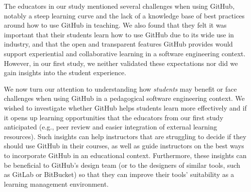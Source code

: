 The educators in our study mentioned several challenges when using GitHub, notably a steep learning curve and the lack of a knowledge base of best practices around how to use GitHub in teaching. We also found that they felt it was important that their students learn how to use GitHub due to its wide use in industry, and that the open and transparent features GitHub provides would support experiential and collaborative learning in a software engineering context. However, in our first study, we neither validated these expectations nor did we gain insights into the student experience.

We now turn our attention to understanding how \emph{students} may benefit or face challenges when using GitHub in a pedagogical software engineering context. We wished to investigate whether GitHub helps students learn more effectively and if it opens up learning opportunities that the educators from our first study anticipated (e.g., peer review and easier integration of external learning resources). Such insights can help instructors that are struggling to decide if they should use GitHub in their courses, as well as guide instructors on the best ways to incorporate GitHub in an educational context. Furthermore, these insights can be beneficial to GitHub's design team (or to the designers of similar tools, such as GitLab or BitBucket) so that they can improve their tools' suitability as a learning management environment.




